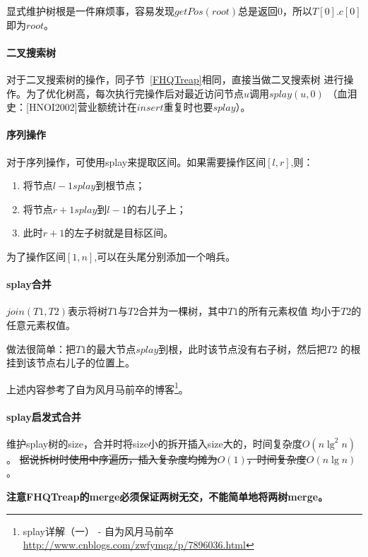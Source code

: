 显式维护树根是一件麻烦事，容易发现$getPos(root)$总是返回0，所以$T[0].c[0]$
即为$root$。

\paragraph{二叉搜索树}

对于二叉搜索树的操作，同子节~\ref{FHQTreap}相同，直接当做二叉搜索树
进行操作。为了优化树高，每次执行完操作后对最近访问节点$u$调用$splay(u,0)$
（血泪史：[HNOI2002]营业额统计在$insert$重复时也要$splay$）。

\paragraph{序列操作}

对于序列操作，可使用splay来提取区间。如果需要操作区间$[l,r]$,则：

\begin{enumerate}
	\item 将节点$l-1 splay$到根节点；
	\item 将节点$r+1 splay$到$l-1$的右儿子上；
	\item 此时$r+1$的左子树就是目标区间。
\end{enumerate}

为了操作区间$[1,n]$,可以在头尾分别添加一个哨兵。

\paragraph{splay合并}

$join(T1,T2)$表示将树$T1$与$T2$合并为一棵树，其中$T1$的所有元素权值
均小于$T2$的任意元素权值。

做法很简单：把$T1$的最大节点$splay$到根，此时该节点没有右子树，然后把$T2$
的根挂到该节点右儿子的位置上。

上述内容参考了自为风月马前卒的博客\footnote{splay详解（一） - 自为风月马前卒
	\url{http://www.cnblogs.com/zwfymqz/p/7896036.html}}。

\paragraph{splay启发式合并}
维护splay树的size，合并时将size小的拆开插入size大的，时间复杂度$O(n\lg^2n)$。
\sout{据说拆树时使用中序遍历，插入复杂度均摊为$O(1)$，时间复杂度$O(n\lg n)$}。

{\bfseries 注意FHQTreap的merge必须保证两树无交，不能简单地将两树merge。}
